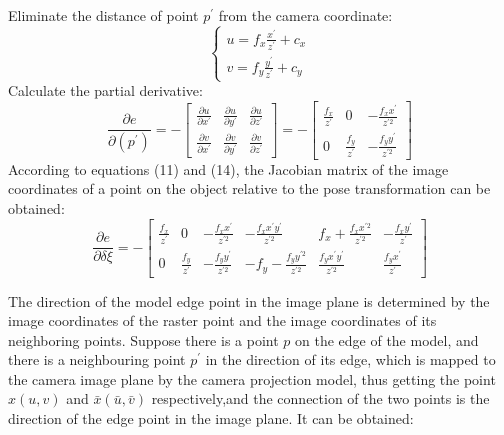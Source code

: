 \documentclass{cta-author}
\begin{document}
Eliminate the distance of point $p^{'}$ from the camera coordinate:
\begin{equation}\label{eq13}
  \begin{cases}
    u=f_x \frac{x^{'}}{z^{'}}+c_x\\
    v=f_y \frac{y^{'}}{z^{'}}+c_y
  \end{cases}
\end{equation}
Calculate the partial derivative:
\begin{equation}\label{eq14}
\frac{\partial e}{\partial(p^{'})}
=-\begin{bmatrix} 
  \frac{\partial u}{\partial x^{'}} & \frac{\partial u}{\partial y^{'}} & \frac{\partial u}{\partial z^{'}}\\
  \frac{\partial v}{\partial x^{'}} & \frac{\partial v}{\partial y^{'}} & \frac{\partial v}{\partial z^{'}}
\end{bmatrix} 
=-\begin{bmatrix} 
  \frac{f_x}{z^{'}} & 0 & -\frac{f_x x^{'}}{z^{'2}}\\
   0 & \frac{f_y}{z^{'}} & -\frac{f_y y^{'}}{z^{'2}}
\end{bmatrix} 
\end{equation}
According to equations (11) and (14), the Jacobian matrix of the image coordinates of a point on the object relative to the pose transformation can be obtained:
\begin{equation}\label{eq15}
  \frac{\partial e}{\partial \delta\xi}
  =-\begin{bmatrix} 
    \frac{f_x}{z^{'}} & 0 & -\frac{f_x x^{'}}{z^{'2}} & -\frac{f_x x^{'}y^{'}}{z^{'2}} & f_x+\frac{f_x x^{'2}}{z^{'2}} & -\frac{f_x y^{'}}{z^{'}}\\
    0 & \frac{f_y}{z^{'}} &-\frac{f_y y^{'}}{z^{'2}} & -f_y-\frac{f_y y^{'2}}{z^{'2}} & \frac{f_y x^{'}y^{'}}{z^{'2}} & \frac{f_y x^{'}}{z^{'}}
  \end{bmatrix} 
  \end{equation}

  The direction of the model edge point in the image plane is determined by the image coordinates of the raster point and the image coordinates of its neighboring points. Suppose there is a point $p$ on the edge of the model, and there is a neighbouring point $p^{'}$ in the direction of its edge, which is mapped to the camera image plane by the camera projection model, thus getting the point $x(u,v)$ and $\bar{x}(\bar{u},\bar{v})$ respectively,and the connection of the two points is the direction of the edge point in the image plane. It can be obtained:
\end{document}
